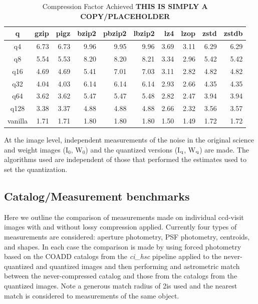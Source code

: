 \begin{table}
\caption{Compression Factor Achieved {\bf THIS IS SIMPLY A COPY/PLACEHOLDER}}
\centering
\begin{tabular}[]{crrrrrrrrr}
\hline
 q        &  gzip & pigz & bzip2 & pbzip2 & lbzip2 & lz4 & lzop & zstd & zstdb  \\
\hline
 q4       &   6.73 &  6.73 &  9.96 &  9.95 &  9.96 &  3.69 &  3.11 &  6.29 &  6.29  \\
 q8       &   5.54 &  5.53 &  8.20 &  8.20 &  8.21 &  3.34 &  2.96 &  5.42 &  5.42  \\
 q16      &   4.69 &  4.69 &  5.41 &  7.01 &  7.03 &  3.11 &  2.82 &  4.82 &  4.82  \\
 q32      &   4.04 &  4.03 &  6.14 &  6.14 &  6.14 &  2.93 &  2.66 &  4.35 &  4.35  \\
 q64      &   3.62 &  3.62 &  5.47 &  5.47 &  5.48 &  2.82 &  2.47 &  3.94 &  3.94  \\
 q128     &   3.38 &  3.37 &  4.88 &  4.88 &  4.88 &  2.66 &  2.32 &  3.56 &  3.57  \\
 vanilla  &   1.71 &  1.71 &  1.80 &  1.80 &  1.80 &  1.50 &  1.49 &  1.72 &  1.72  \\
\hline
\end{tabular}
\label{tab_agg_image}
\end{table}

At the image level, independent measurements of the noise in the original science 
and weight images (I$_{0}$, W$_{0}$) and the quantized versions (I$_{\rm q}$, W$_{\rm q}$) are made.
The algorithms used are independent of those that performed the estimates used to set the quantization.



\subsection{Catalog/Measurement benchmarks}

Here we outline the comparison of measurements made on individual ccd-visit images with and without 
lossy compression applied.  Currently four types of measurements are considered: aperture photometry, 
PSF photometry, centroids, and shapes.  In each case the comparison is made by using forced photometry
based on the COADD catalogs from the {\it ci\_hsc} pipeline applied to the never-quantized and quantized
images and then performing and astrometric match between the never-compressed catalog and those from the
catalogs from the quantized images.  Note a generous match radius of 2\arcsec is used and the nearest match
is considered to measurements of the same object.  


